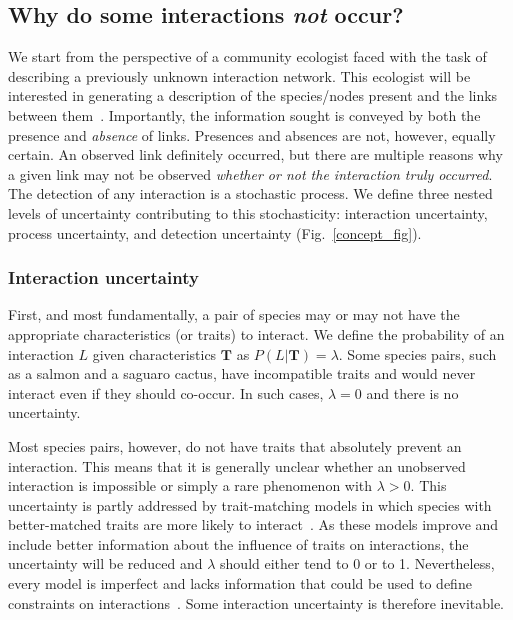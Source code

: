 \documentclass[12pt]{article}
\begin{document}
\begin{spacing}{2.0}
    \subsection*{Why do some interactions \emph{not} occur?}

      We start from the perspective of a community ecologist faced with the task of describing a previously unknown interaction network. This ecologist will be interested in generating a description of the species/nodes present and the links between them~\citep{Roslin2016}.  Importantly, the information sought is conveyed by both the presence and \emph{absence} of links. Presences and absences are not, however, equally certain. An observed link definitely occurred, but there are multiple reasons why a given link may not be observed \emph{whether or not the interaction truly occurred}. The detection of any interaction is a stochastic process. We define three nested levels of uncertainty contributing to this stochasticity: interaction uncertainty, process uncertainty, and detection uncertainty (Fig.~\ref{concept_fig}).


        \subsubsection*{Interaction uncertainty} 

          First, and most fundamentally, a pair of species may or may not have the appropriate characteristics (or traits) to interact. We define the probability of an interaction $L$ given characteristics $\mathbf{T}$ as $P(L | \mathbf{T})=\lambda$. Some species pairs, such as a salmon and a saguaro cactus, have incompatible traits and would never interact even if they should co-occur. In such cases, $\lambda = 0$ and there is no uncertainty. 


          Most species pairs, however, do not have traits that absolutely prevent an interaction. This means that it is generally unclear whether an unobserved interaction is impossible or simply a rare phenomenon with $\lambda>0$. This uncertainty is partly addressed by trait-matching models in which species with better-matched traits are more likely to interact~\citep{Bartomeus2016}. As these models improve and include better information about the influence of traits on interactions, the uncertainty will be reduced and $\lambda$ should either tend to 0 or to 1. Nevertheless, every model is imperfect and lacks information that could be used to define constraints on interactions~\citep{Dormann2017}. Some interaction uncertainty is therefore inevitable.



\end{spacing}
\end{document}
